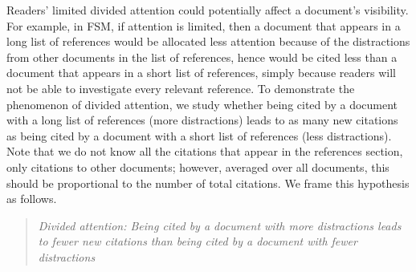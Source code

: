 \documentclass[10pt]{bmc_article}
\newenvironment{bmcformat}{\baselineskip20pt\sloppy\setboolean{publ}{false}}{\baselineskip20pt\sloppy}
\begin{document}
\begin{bmcformat}
Readers' limited divided attention could potentially affect a document's visibility. For example, in FSM, if attention is limited, then a document that appears in a long list of references would be allocated less attention because of the distractions from other documents in the list of references, hence would be cited less than a document that appears in a short list of references, simply because readers will not be able to investigate every relevant reference. To demonstrate the phenomenon of divided attention, we study whether being cited by a document with a long list of references (more distractions) leads to as many new citations as being cited by a document with a short list of references (less distractions). Note that we do not know all the citations that appear in the references section, only citations to other documents; however, averaged over all documents, this should be proportional to the number of total citations.
We frame this hypothesis as follows.

%
\begin{quotation}
\noindent \emph{Divided attention: Being cited by a document with more distractions leads to fewer new citations than being cited by a document  with fewer distractions}
\end{quotation}



\end{bmcformat}
\end{document}
